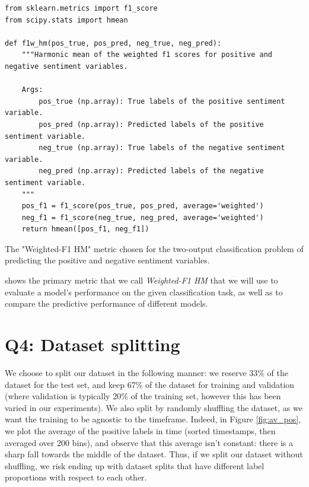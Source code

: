 \begin{listing*}[t]
\begin{verbatim}
from sklearn.metrics import f1_score
from scipy.stats import hmean

def f1w_hm(pos_true, pos_pred, neg_true, neg_pred):
    """Harmonic mean of the weighted f1 scores for positive and negative sentiment variables.

    Args:
        pos_true (np.array): True labels of the positive sentiment variable.
        pos_pred (np.array): Predicted labels of the positive sentiment variable.
        neg_true (np.array): True labels of the negative sentiment variable.
        neg_pred (np.array): Predicted labels of the negative sentiment variable.
    """
    pos_f1 = f1_score(pos_true, pos_pred, average='weighted')
    neg_f1 = f1_score(neg_true, neg_pred, average='weighted')
    return hmean([pos_f1, neg_f1])
\end{verbatim}
\caption{The "Weighted-F1 HM" metric chosen for the two-output classification problem of predicting the positive and negative sentiment variables.}
\label{listing:p1-metric}
\end{listing*}

 shows the primary metric that we call \textit{Weighted-F1 HM} that we will use to evaluate a model's performance on the given classification task, as well as to compare the predictive performance of different models.


\section*{Q4: Dataset splitting}

We choose to split our dataset in the following manner: we reserve 33\% of the dataset for the test set, and keep 67\% of the dataset for training and validation (where validation is typically 20\% of the training set, however this has been varied in our experiments). We also split by randomly shuffling the dataset, as we want the training to be agnostic to the timeframe. Indeed, in Figure \ref{fig:av_pos}, we plot the average of the positive labels in time (sorted timestamps, then averaged over 200 bins), and observe that this average isn't constant: there is a sharp fall towards the middle of the dataset. Thus, if we split our dataset without shuffling, we risk ending up with dataset splits that have different label proportions with respect to each other.


